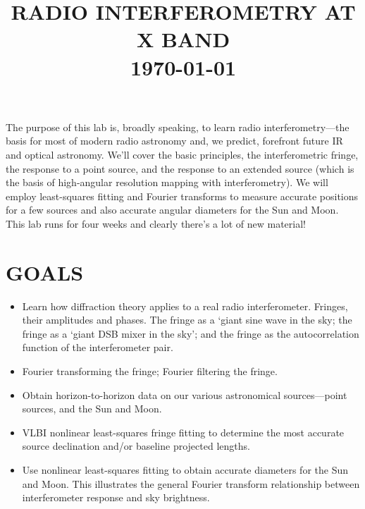 \documentclass[11pt,preprint]{aastex}
\begin{document}
\def\simlt{\lower.5ex\hbox{$\; \buildrel < \over \sim \;$}}
\def\simgt{\lower.5ex\hbox{$\; \buildrel > \over \sim \;$}}


\title {RADIO INTERFEROMETRY AT X BAND \\ \today}

\tableofcontents

The purpose of this lab is, broadly speaking, to learn radio
interferometry---the basis for most of modern radio astronomy and, we
predict, forefront future IR and optical astronomy. We'll cover the
basic principles, the interferometric fringe, the response to a point
source, and the response to an extended source (which is the basis of
high-angular resolution mapping with interferometry). We will employ
least-squares fitting and Fourier transforms to measure accurate
positions for a few sources and also accurate angular diameters for the
Sun and Moon. This lab runs for four weeks and clearly there's a lot of new
material!

\section{GOALS}

\begin{itemize}

\item Learn how diffraction theory applies to a real radio
  interferometer. Fringes, their amplitudes and phases. The fringe as a
  `giant sine wave in the sky; the fringe as a `giant DSB mixer in
  the sky'; and the fringe as the autocorrelation function of the
  interferometer pair.

\item Fourier transforming the fringe; Fourier filtering the fringe.

\item Obtain horizon-to-horizon data on our various astronomical
  sources---point sources, and the Sun and Moon.

\item VLBI nonlinear least-squares fringe fitting to determine the most
  accurate source declination and/or baseline projected lengths.

\item Use nonlinear least-squares fitting to obtain accurate diameters
  for the Sun and Moon. This illustrates the general Fourier transform
  relationship between interferometer response and sky brightness.

\end{itemize}
\end{document}

